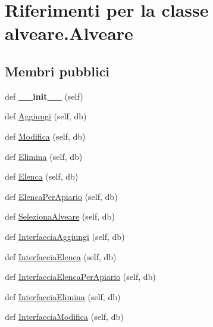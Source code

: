 \hypertarget{classalveare_1_1Alveare}{}\section{Riferimenti per la classe alveare.\+Alveare}
\label{classalveare_1_1Alveare}
\subsection*{Membri pubblici}
\begin{DoxyCompactItemize}
\item 
def {\bfseries \+\_\+\+\_\+init\+\_\+\+\_\+} (self)\hypertarget{classalveare_1_1Alveare_a0e989be377f682b42c586be0b4b7d3dc}{}\label{classalveare_1_1Alveare_a0e989be377f682b42c586be0b4b7d3dc}

\item 
def \hyperlink{classalveare_1_1Alveare_ab96add517787f0990d1a31229b84023e}{Aggiungi} (self, db)
\item 
def \hyperlink{classalveare_1_1Alveare_aba890e70322f90209af9b1e8a25fb5c5}{Modifica} (self, db)
\item 
def \hyperlink{classalveare_1_1Alveare_a9ced552f759d330ebe2001cc90651763}{Elimina} (self, db)
\item 
def \hyperlink{classalveare_1_1Alveare_ae7441be09d9bf0d8c2248a24534b1285}{Elenca} (self, db)
\item 
def \hyperlink{classalveare_1_1Alveare_a94c2d472ef129a78f48584b146c25ad9}{Elenca\+Per\+Apiario} (self, db)
\item 
def \hyperlink{classalveare_1_1Alveare_a0f3bb1ea1a2356f64130a24a758db15c}{Seleziona\+Alveare} (self, db)
\item 
def \hyperlink{classalveare_1_1Alveare_abf2c97ac838ed0af2326ee4cd4742820}{Interfaccia\+Aggiungi} (self, db)
\item 
def \hyperlink{classalveare_1_1Alveare_aabdd9656e20b585b82c7228ac2333abf}{Interfaccia\+Elenca} (self, db)
\item 
def \hyperlink{classalveare_1_1Alveare_a6ec7088fcbc0c793b13393312214d606}{Interfaccia\+Elenca\+Per\+Apiario} (self, db)
\item 
def \hyperlink{classalveare_1_1Alveare_ab6258c6e80bfb867da2ea5174b8da49f}{Interfaccia\+Elimina} (self, db)
\item 
def \hyperlink{classalveare_1_1Alveare_ae2c17e8699eb4d8d39825159a8b7ddff}{Interfaccia\+Modifica} (self, db)
\end{DoxyCompactItemize}
